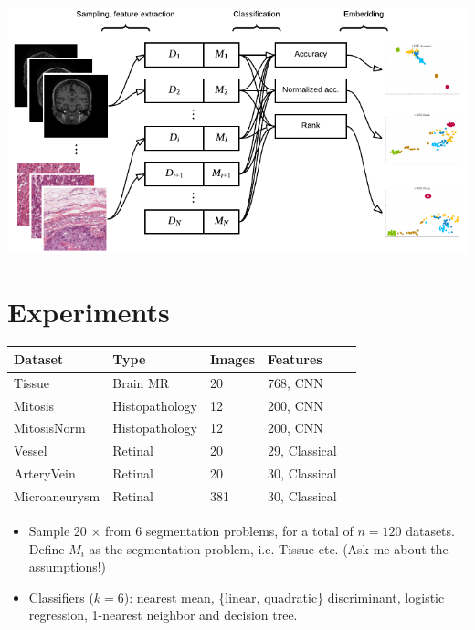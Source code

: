 \documentclass[a4paper,11pt]{article}
\begin{document}
\begin{slidetop}
\begin{multicols}{2}
\begin{center}
  \includegraphics[width=0.9\columnwidth]{overview.pdf}%
  \label{fig:mil}
\end{center}



\section*{Experiments}

\footnotesize

\begin{center}
\begin{tabular}{l l l l l}
\hline
Dataset & Type & Images & Features \\
\hline

Tissue & Brain MR & 20 &  768, CNN \\
Mitosis & Histopathology & 12 &  200, CNN \\
MitosisNorm & Histopathology & 12 &  200, CNN \\
Vessel & Retinal & 20 & 29, Classical \\
ArteryVein & Retinal & 20 &  30, Classical \\
Microaneurysm & Retinal & 381 & 30, Classical\\
\hline
\end{tabular}
\label{tab:datasets}
\end{center}

\normalsize

\begin{itemize}
\item Sample 20 $\times$ from 6 segmentation problems, for a total of $n=120$ datasets. Define $M_i$ as the segmentation problem, i.e. Tissue etc. (Ask me about the assumptions!)

\item Classifiers ($k=6$): nearest mean, \{linear, quadratic\} discriminant, logistic regression, 1-nearest neighbor and decision tree. 


\end{itemize}
\end{multicols}
\end{slidetop}
\end{document}
